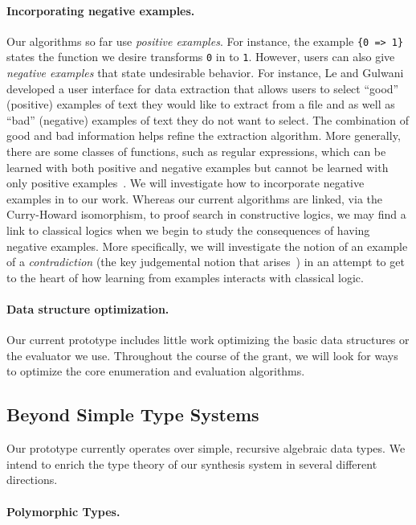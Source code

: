 \paragraph*{Incorporating negative examples.}
Our algorithms so far use \emph{positive examples}. For instance,
the example \texttt{\{0 => 1\}} states the function we desire transforms
\texttt{0} in to \texttt{1}.  However, users can also give \emph{negative
examples} that state undesirable behavior.  For instance, Le and Gulwani~\cite{vu-pldi-2014} developed a user interface for data extraction
that allows users to select ``good'' (positive) examples of text
they would like to extract from a file and as well as ``bad'' (negative)
examples of text they do not want to select.  The combination of good
and bad information helps refine the extraction algorithm.  More generally,
there are some classes of functions, such as regular expressions,
which can be learned with both positive and negative examples
but cannot be learned with only positive examples~\cite{gold:inference}.  
We will
investigate how to incorporate negative examples in to our
work.  Whereas our current algorithms are linked, via the Curry-Howard
isomorphism, to proof search
in constructive logics, we may find a link to classical logics when
we begin to study the consequences of having negative examples.
More specifically, we will investigate the notion of an example
of a \emph{contradiction} (the key judgemental notion that 
arises~\cite{pfenning:classical}) 
in an attempt to get to the heart of how learning
from examples interacts with classical logic.

\paragraph*{Data structure optimization.}
Our current prototype includes little work optimizing the basic data
structures or the evaluator we use.  Throughout the
course of the grant, we will look for ways to optimize the core enumeration
and evaluation algorithms.

\subsection{Beyond Simple Type Systems}
\label{sec:types}

Our prototype currently operates over simple, recursive algebraic
data types.  We intend to enrich the type theory of our synthesis
system in several different directions.

\paragraph*{Polymorphic Types.}

